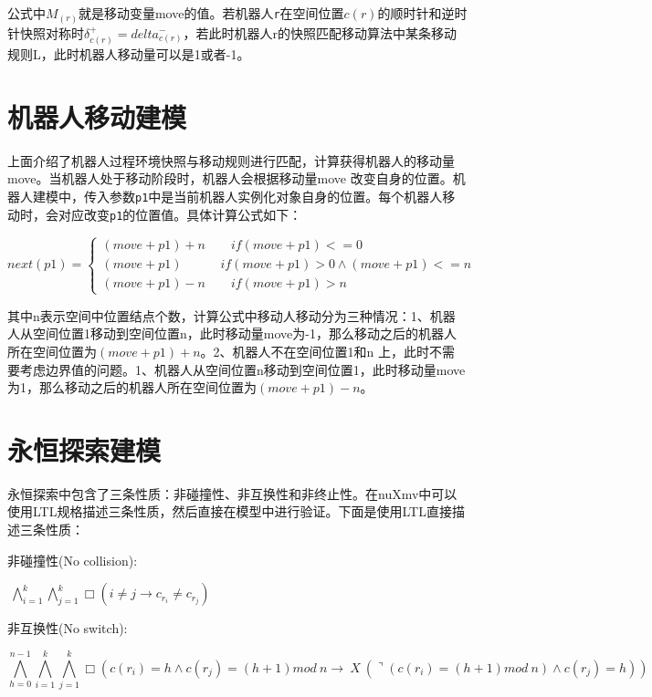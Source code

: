 公式中$M_{\left(r\right)}$就是移动变量move的值。若机器人\verb|r|在空间位置$c\left(r\right)$的顺时针和逆时针快照对称时$\delta_{c\left(r\right)}^+ = delta_{c\left(r\right)}^-$，若此时机器人r的快照匹配移动算法中某条移动规则L，此时机器人移动量可以是1或者-1。

\section{机器人移动建模}
上面介绍了机器人过程环境快照与移动规则进行匹配，计算获得机器人的移动量move。当机器人处于移动阶段时，机器人会根据移动量move 改变自身的位置。机器人建模中，传入参数\verb|p1|中是当前机器人实例化对象自身的位置。每个机器人移动时，会对应改变\verb|p1|的位置值。具体计算公式如下：

$$ next\left(p1\right) = \left\{
\begin{array}{lcl}
\left(move + p1\right) + n \quad \quad  if \left(move + p1\right) <= 0  \\
\left(move + p1\right)     \quad \quad \quad  if \left(move + p1\right) > 0 \land \left(move + p1\right) <= n \\
\left(move + p1\right) - n \quad \quad  if \left(move + p1\right) > n
\end{array}
\right. $$

其中n表示空间中位置结点个数，计算公式中移动人移动分为三种情况：1、机器人从空间位置1移动到空间位置n，此时移动量move为-1，那么移动之后的机器人所在空间位置为$\left(move + p1\right) + n$。2、机器人不在空间位置1和n 上，此时不需要考虑边界值的问题。1、机器人从空间位置n移动到空间位置1，此时移动量move为1，那么移动之后的机器人所在空间位置为$\left(move + p1\right) - n$。


\section{永恒探索建模}
永恒探索中包含了三条性质：非碰撞性、非互换性和非终止性。在nuXmv中可以使用LTL规格描述三条性质，然后直接在模型中进行验证。下面是使用LTL直接描述三条性质：

\vspace{0.2cm}

\begin{bfseries}非碰撞性(No collision):\end{bfseries}$\ \bigwedge_{i=1}^{k} \bigwedge_{j=1}^{k} \Box \left(i \neq j \rightarrow c_{r_i} \neq c_{r_j}\right)$

\vspace{0.2cm}

\begin{bfseries}非互换性(No switch):\end{bfseries}$$\bigwedge_{h=0}^{n-1}\bigwedge_{i=1}^{k}\bigwedge_{j=1}^{k}  \Box \left(c\left(r_i\right)=h \land  c \left(r_j \right) = \left(h + 1 \right) mod \ n  \rightarrow \ X \ \left( \urcorner  \left(c\left(r_i\right)  = \left(h+1\right) mod \ n \right)   \land c\left(r_j\right) =h \right)\right)$$


